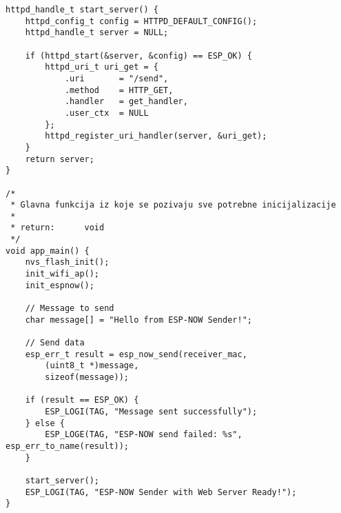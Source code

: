 \documentclass[seminarskirad]{fer}
\begin{document}
\begin{lstlisting}[caption=ESP-NOW sender]
httpd_handle_t start_server() {
    httpd_config_t config = HTTPD_DEFAULT_CONFIG();
    httpd_handle_t server = NULL;

    if (httpd_start(&server, &config) == ESP_OK) {
        httpd_uri_t uri_get = {
            .uri       = "/send",
            .method    = HTTP_GET,
            .handler   = get_handler,
            .user_ctx  = NULL
        };
        httpd_register_uri_handler(server, &uri_get);
    }
    return server;
}

/*
 * Glavna funkcija iz koje se pozivaju sve potrebne inicijalizacije
 * 
 * return:      void
 */
void app_main() {
    nvs_flash_init();
    init_wifi_ap();
    init_espnow();

    // Message to send
    char message[] = "Hello from ESP-NOW Sender!";
    
    // Send data
    esp_err_t result = esp_now_send(receiver_mac, 
        (uint8_t *)message, 
        sizeof(message));

    if (result == ESP_OK) {
        ESP_LOGI(TAG, "Message sent successfully");
    } else {
        ESP_LOGE(TAG, "ESP-NOW send failed: %s", esp_err_to_name(result));
    }

    start_server();
    ESP_LOGI(TAG, "ESP-NOW Sender with Web Server Ready!");
}
\end{lstlisting}

\newpage
\end{document}
